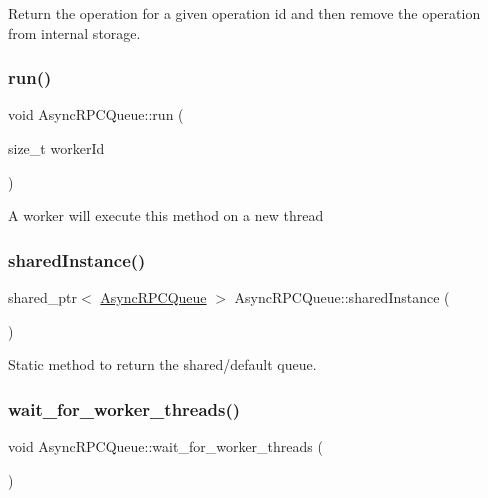 Return the operation for a given operation id and then remove the operation from internal storage. \mbox{\label{class_async_r_p_c_queue_ac3d5fdff7da17f6d3e7c431d5a73362f}} 
\subsubsection{\texorpdfstring{run()}{run()}}
{\footnotesize\ttfamily void Async\+R\+P\+C\+Queue\+::run (\begin{DoxyParamCaption}\item[{size\+\_\+t}]{worker\+Id }\end{DoxyParamCaption})\hspace{0.3cm}{\ttfamily [private]}}

A worker will execute this method on a new thread \mbox{\label{class_async_r_p_c_queue_a58fbaf8e8a9d3dfbc22dfc62651cd781}} 
\subsubsection{\texorpdfstring{shared\+Instance()}{sharedInstance()}}
{\footnotesize\ttfamily shared\+\_\+ptr$<$ \mbox{\hyperlink{class_async_r_p_c_queue}{Async\+R\+P\+C\+Queue}} $>$ Async\+R\+P\+C\+Queue\+::shared\+Instance (\begin{DoxyParamCaption}{ }\end{DoxyParamCaption})\hspace{0.3cm}{\ttfamily [static]}}

Static method to return the shared/default queue. \mbox{\label{class_async_r_p_c_queue_aa3c4318cddf22d01c67a6f681a631527}} 
\subsubsection{\texorpdfstring{wait\+\_\+for\+\_\+worker\+\_\+threads()}{wait\_for\_worker\_threads()}}
{\footnotesize\ttfamily void Async\+R\+P\+C\+Queue\+::wait\+\_\+for\+\_\+worker\+\_\+threads (\begin{DoxyParamCaption}{ }\end{DoxyParamCaption})\hspace{0.3cm}{\ttfamily [private]}}

